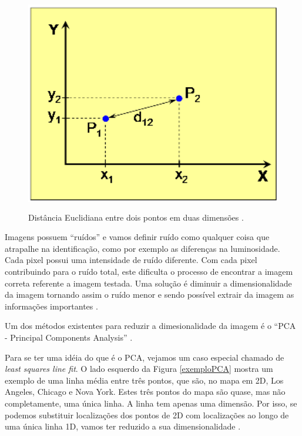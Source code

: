     \begin{figure}[hbt]
		\begin{center}
			\includegraphics[height=9.5cm,width=12.5cm]{figuras/2.FundamentacaoTeorica/graficoDistanciaEntrePontos.png}
		\end{center}
		\caption{Distância Euclidiana entre dois pontos em duas dimensões \cite{hewitt}.}
		\label{distanciaEntrePontos}
	\end{figure}


Imagens possuem ``ruídos'' e vamos definir ruído como qualquer coisa que atrapalhe na identificação, como por exemplo as diferenças na luminosidade. Cada pixel possui uma intensidade de ruído diferente. Com cada pixel contribuindo para o ruído total, este dificulta o processo de encontrar a imagem correta referente a imagem testada. Uma solução é diminuir a dimensionalidade da imagem tornando assim o ruído menor e sendo possível extrair da imagem as informações importantes \cite{hewitt}.

Um dos métodos existentes para reduzir a dimesionalidade da imagem é o ``PCA - Principal Components Analysis'' \cite{hewitt}.

Para se ter uma idéia do que é o PCA, vejamos um caso especial chamado de \textit{least squares line fit}. O lado esquerdo da Figura \ref{exemploPCA} mostra um exemplo de uma linha média entre três pontos, que são, no mapa em 2D, Los Angeles, Chicago e Nova York. Estes três pontos do mapa são quase, mas não completamente, uma única linha. A linha tem apenas uma dimensão. Por isso, se podemos substituir localizações dos pontos de 2D com localizações ao longo de uma única linha 1D, vamos ter reduzido a sua dimensionalidade \cite{hewitt}.

